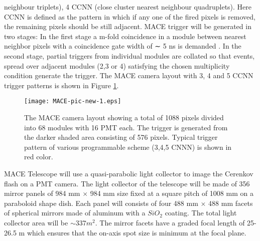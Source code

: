 \documentclass[preprint,12pt]{elsarticle}
\begin{document}
neighbour triplets), 4 CCNN (close cluster nearest neighbour quadruplets). Here CCNN is defined as the pattern in which if any
one of the fired pixels is removed, the remaining pixels should be still adjacent. MACE trigger will be generated in two stages: In the first stage a m-fold 
coincidence in a module between 
nearest neighbor pixels with a coincidence gate width of ∼ 5 ns is demanded . In the second stage, partial triggers from individual modules are collated so that events, spread
over adjacent modules (2,3 or 4) satisfying the chosen multiplicity condition generate the trigger.  %
The MACE camera layout with 3, 4 and 5 CCNN trigger patterns is shown in Figure \ref{Figure:maceCam}. 
\begin{figure}[!h]
\begin{center}
\texttt{[image: MACE-pic-new-1.eps]}
\caption{\label{Figure.} The MACE camera layout showing a total of 1088 pixels divided into 68 modules with 16 PMT each. The trigger is generated from the darker shaded area  
consisting of 576 pixels. Typical trigger pattern of various programmable scheme (3,4,5 CNNN) is shown in red color.}\label{Figure:maceCam}
\end{center}
\end{figure}

MACE Telescope will use a quasi-parabolic light collector to image the Cerenkov flash on a PMT camera. The light collector of the telescope will be made of 356 mirror panels of 
984 mm $\times$ 984 mm size fixed at a square pitch of 1008 mm on a paraboloid shape  dish. Each panel will consists of four 488 mm $\times$ 488 mm facets of spherical 
mirrors made of aluminum with a $SiO_2$ coating. The total light collector area will be $\sim 337 m^2$. The mirror facets have a graded focal length of 25-26.5 m 
which ensures that the on-axis spot size is minimum at the focal plane.
\end{document}
